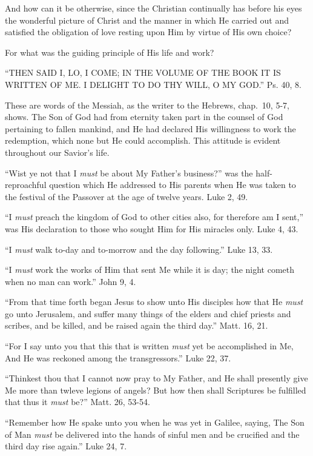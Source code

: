 \documentclass[
]{book}
\begin{document}
And how can it be otherwise, since the Christian continually has before his eyes the wonderful picture of Christ and the manner in which He carried out and satisfied the obligation of love resting upon Him by virtue of His own choice?

For what was the guiding principle of His life and work?

``THEN SAID I, LO, I COME; IN THE VOLUME OF THE BOOK IT IS WRITTEN OF ME. I DELIGHT TO DO THY WILL, O MY GOD.'' Ps. 40, 8.

These are words of the Messiah, as the writer to the Hebrews, chap.~10, 5-7, shows. The Son of God had from eternity taken part in the counsel of God pertaining to fallen mankind, and He had declared His willingness to work the redemption, which none but He could accomplish. This attitude is evident throughout our Savior's life.

``Wist ye not that I \emph{must} be about My Father's business?'' was the half-reproachful question which He addressed to His parents when He was taken to the festival of the Passover at the age of twelve years. Luke 2, 49.

``I \emph{must} preach the kingdom of God to other cities also, for therefore am I sent,'' was His declaration to those who sought Him for His miracles only. Luke 4, 43.

``I \emph{must} walk to-day and to-morrow and the day following.'' Luke 13, 33.

``I \emph{must} work the works of Him that sent Me while it is day; the night cometh when no man can work.'' John 9, 4.

``From that time forth began Jesus to show unto His disciples how that He \emph{must} go unto Jerusalem, and suffer many things of the elders and chief priests and scribes, and be killed, and be raised again the third day.'' Matt. 16, 21.

``For I say unto you that this that is written \emph{must} yet be accomplished in Me, And He was reckoned among the transgressors.'' Luke 22, 37.

``Thinkest thou that I cannot now pray to My Father, and He shall presently give Me more than twleve legions of angels? But how then shall Scriptures be fulfilled that thus it \emph{must} be?'' Matt. 26, 53-54.

``Remember how He spake unto you when he was yet in Galilee, saying, The Son of Man \emph{must} be delivered into the hands of sinful men and be crucified and the third day rise again.'' Luke 24, 7.
\end{document}
